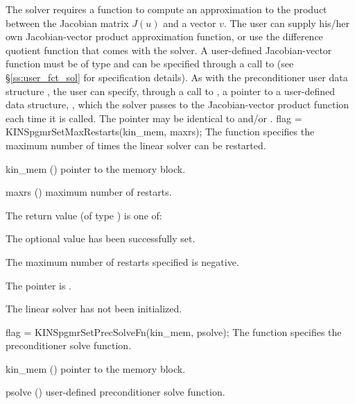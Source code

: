 The 
{\kinspgmr} solver requires a function to compute an approximation to the
product between the Jacobian matrix $J(u)$ and a vector $v$.
The user can supply his/her own Jacobian-vector product approximation function, 
or use the difference quotient function  
that comes with the {\kinspgmr} solver.
A user-defined Jacobian-vector function must be of type  and 
can be specified through a call to  
(see \S\ref{ss:user_fct_sol} for specification details).
As with the preconditioner user data structure , 
the user can specify, through a call to , a pointer to a 
user-defined data structure, , which
the {\kinspgmr} solver passes to the Jacobian-vector product function  each
time it is called.  
The pointer  may be identical to  and/or .
{
  flag = KINSpgmrSetMaxRestarts(kin\_mem, maxrs);
}
{
  The function  specifies the maximum
  number of times the {\spgmr} linear solver can be restarted.
}
{
  \begin{args}
  \item[kin\_mem] ()
    pointer to the {\kinsol} memory block.
  \item[maxrs] ()
    maximum number of restarts.
  \end{args}
}
{
  The return value  (of type ) is one of:
  \begin{args}
  \item[\Id{KINSPGMR\_SUCCESS}] 
    The optional value has been successfully set.
  \item[\Id{KINSPGMR\_ILL\_INPUT}]
    The maximum number of restarts specified is negative.
  \item[\Id{KINSPGMR\_MEM\_NULL}]
    The  pointer is .
  \item[\Id{KINSPGMR\_LMEM\_NULL}]
    The {\kinspgmr} linear solver has not been initialized.
  \end{args}
}
{}
{
  flag = KINSpgmrSetPrecSolveFn(kin\_mem, psolve);
}
{
  The function  specifies the preconditioner
  solve function.
}
{
  \begin{args}
  \item[kin\_mem] ()
    pointer to the {\kinsol} memory block.
  \item[psolve] ()
    user-defined preconditioner solve function.
  \end{args}
}
